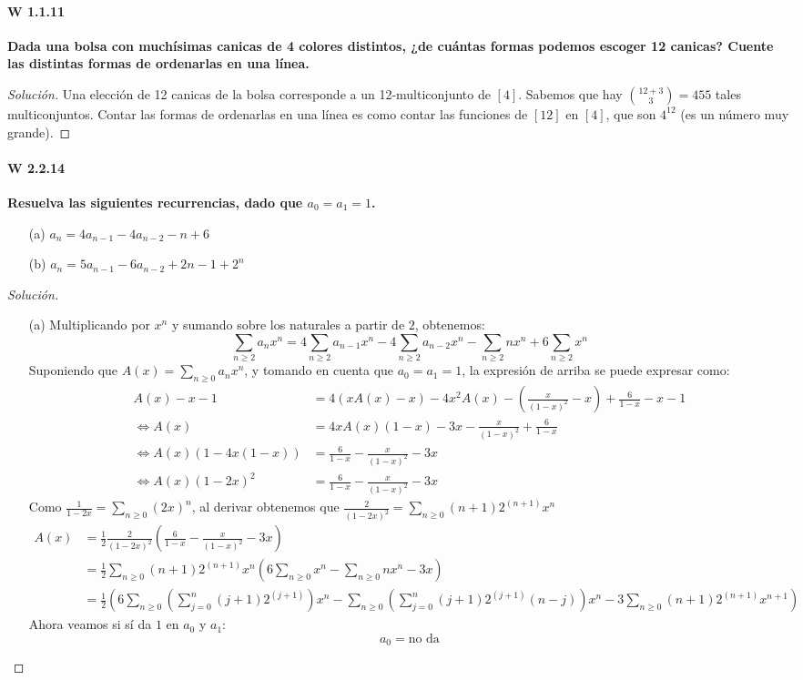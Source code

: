 \documentclass[spanish]{book}
\theoremstyle{definition}
\begin{document}
\paragraph{W 1.1.11}\textbf{Dada una bolsa con muchísimas canicas de 4 colores distintos, ¿de cuántas formas podemos escoger 12 canicas? Cuente las distintas formas de ordenarlas en una línea.}
\begin{proof}[Solución]
	Una elección de 12 canicas de la bolsa corresponde a un 12-multiconjunto de $[4]$. Sabemos que hay ${12+3\choose3}=455$ tales multiconjuntos. Contar las formas de ordenarlas en una línea es como contar las funciones de $[12]$ en $[4]$, que son $4^{12}$ (es un número muy grande).
\end{proof}

\paragraph{W 2.2.14}\textbf{Resuelva las siguientes recurrencias, dado que $a_0=a_1=1$.}
\begin{itemize}
	\item [(a)]$a_n=4a_{n-1}-4a_{n-2}-n+6$
	\item[(b)]$a_n=5a_{n-1}-6a_{n-2}+2n-1+2^n$
\end{itemize}
\begin{proof}[Solución]\leavevmode
\begin{itemize}
\item [(a)] Multiplicando por $x^n$ y sumando sobre los naturales a partir de $2$, obtenemos:
	\[\sum_{n\geq2}a_nx^n=4\sum_{n\geq2}a_{n-1}x^n-4\sum_{n\geq2}a_{n-2}x^n-\sum_{n\geq2}nx^n+6\sum_{n\geq2}x^n\]
Suponiendo que $A(x)=\sum_{n\geq0}a_nx^n$, y tomando en cuenta que $a_0=a_1=1$, la expresión de arriba se puede expresar como:
	\begin{align*}
		A(x)-x-1&=4(xA(x)-x)-4x^2A(x)-\left(\frac{x}{(1-x)^2}-x\right)+\frac{6}{1-x}-x-1\\
		\iff A(x)&=4xA(x)(1-x)-3x-\frac{x}{(1-x)^2}+\frac{6}{1-x}\\
		\iff A(x)(1-4x(1-x))&=\frac{6}{1-x}-\frac{x}{(1-x)^2}-3x\\
		\iff A(x)(1-2x)^2&=\frac{6}{1-x}-\frac{x}{(1-x)^2}-3x
	\end{align*}
Como $\frac{1}{1-2x}=\sum_{n\geq0}(2x)^n$, al derivar obtenemos que $\frac{2}{(1-2x)^2}=\sum_{n\geq0}(n+1)2^{(n+1)}x^{n}$
	\begin{align*}
		A(x)&= \frac{1}{2}\frac{2}{(1-2x)^2}\left(\frac{6}{1-x}-\frac{x}{(1-x)^2}-3x\right)\\
		&=\frac{1}{2}\sum_{n\geq0}(n+1)2^{(n+1)}x^{n}\left(6\sum_{n\geq0}x^n-\sum_{n\geq0}nx^n-3x\right)\\
		&=\frac{1}{2}\left(6\sum_{n\geq0}\left(\sum_{j=0}^n (j+1)2^{(j+1)}\right)x^n-\sum_{n\geq0}\left(\sum_{j=0}^n (j+1)2^{(j+1)}(n-j)\right)x^n-3\sum_{n\geq0}(n+1)2^{(n+1)}x^{n+
		1}\right)
	\end{align*}
Ahora veamos si sí da $1$ en $a_0$ y $a_1$:
\[a_0=\text{no da}\]

	
\end{itemize}
\end{proof}
	
\end{document}
